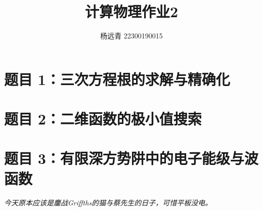 \documentclass[11pt]{article}
\author{杨远青 22300190015}
\title{计算物理作业2}
\begin{document}
\maketitle

\section{题目 1：三次方程根的求解与精确化}


\section{题目 2：二维函数的极小值搜索}


\section{题目 3：有限深方势阱中的电子能级与波函数}


\vspace{5pt}
\textit{今天原本应该是鏖战Griffths的猫与蔡先生的日子，可惜平板没电。}
\end{document}
